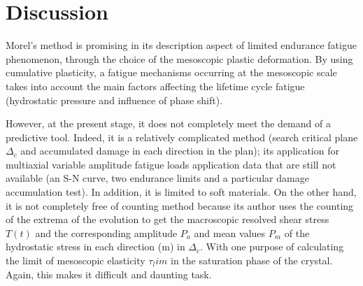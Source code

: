 \documentclass[3p,times,procedia,number]{elsarticle}
\begin{document}
\section{Discussion}
Morel's method is promising in its description aspect of limited endurance fatigue phenomenon, through the choice of the  mesoscopic plastic deformation. By using cumulative plasticity, a fatigue mechanisms occurring at the mesoscopic scale takes into account the main factors affecting the lifetime cycle fatigue (hydrostatic pressure and influence of phase shift). 

However, at the present stage, it does not completely meet the demand of a predictive tool. Indeed, it is a relatively complicated method (search critical plane $\Delta_c$ and accumulated damage in each direction in the plan); its application for multiaxial variable amplitude fatigue loads application data that are still not available (an S-N curve, two endurance limits and a particular  damage accumulation test). In addition, it is limited to soft materials. On the other hand, it is not completely free of counting method because its author uses the counting of the extrema of the evolution to get the macroscopic resolved shear stress $T(t)$ and the corresponding amplitude $P_a$ and mean values $P_m$ of the hydrostatic stress in each direction (m) in $\Delta_c$. With one purpose of calculating the limit of mesoscopic elasticity $\tau_lim$ in the saturation phase of the crystal. Again, this makes it difficult and daunting task.




\end{document}
